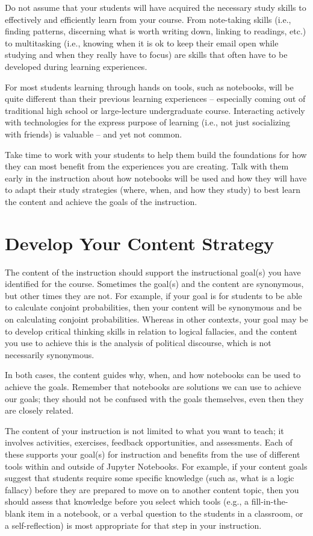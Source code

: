 \documentclass[]{book}
\begin{document}
Do not assume that your students will have acquired the necessary study
skills to effectively and efficiently learn from your course. From
note-taking skills (i.e., finding patterns, discerning what is worth
writing down, linking to readings, etc.) to multitasking (i.e., knowing
when it is ok to keep their email open while studying and when they
really have to focus) are skills that often have to be developed during
learning experiences.

For most students learning through hands on tools, such as notebooks,
will be quite different than their previous learning experiences --
especially coming out of traditional high school or large-lecture
undergraduate course. Interacting actively with technologies for the
express purpose of learning (i.e., not just socializing with friends) is
valuable -- and yet not common.

Take time to work with your students to help them build the foundations
for how they can most benefit from the experiences you are creating.
Talk with them early in the instruction about how notebooks will be used
and how they will have to adapt their study strategies (where, when, and
how they study) to best learn the content and achieve the goals of the
instruction.

\section{Develop Your Content
Strategy}\label{develop-your-content-strategy}

The content of the instruction should support the instructional goal(s)
you have identified for the course. Sometimes the goal(s) and the
content are synonymous, but other times they are not. For example, if
your goal is for students to be able to calculate conjoint
probabilities, then your content will be synonymous and be on
calculating conjoint probabilities. Whereas in other contexts, your goal
may be to develop critical thinking skills in relation to logical
fallacies, and the content you use to achieve this is the analysis of
political discourse, which is not necessarily synonymous.

In both cases, the content guides why, when, and how notebooks can be
used to achieve the goals. Remember that notebooks are solutions we can
use to achieve our goals; they should not be confused with the goals
themselves, even then they are closely related.

The content of your instruction is not limited to what you want to
teach; it involves activities, exercises, feedback opportunities, and
assessments. Each of these supports your goal(s) for instruction and
benefits from the use of different tools within and outside of Jupyter
Notebooks. For example, if your content goals suggest that students
require some specific knowledge (such as, what is a logic fallacy)
before they are prepared to move on to another content topic, then you
should assess that knowledge before you select which tools (e.g., a
fill-in-the-blank item in a notebook, or a verbal question to the
students in a classroom, or a self-reflection) is most appropriate for
that step in your instruction.
\end{document}
